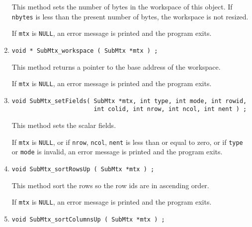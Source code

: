 \begin{enumerate}
\begin{verbatim}
\end{verbatim}
\par
This method sets the number of bytes in the workspace of this object.
If {\tt nbytes} is less than the present number of bytes, 
the workspace is not resized.
\par {}
If {\tt mtx} is {\tt NULL},
an error message is printed and the program exits.
\item
\begin{verbatim}
void * SubMtx_workspace ( SubMtx *mtx ) ;
\end{verbatim}
This method returns a pointer to the base address of the workspace.
\par {}
If {\tt mtx} is {\tt NULL},
an error message is printed and the program exits.
\item
\begin{verbatim}
void SubMtx_setFields( SubMtx *mtx, int type, int mode, int rowid, 
                       int colid, int nrow, int ncol, int nent ) ;
\end{verbatim}
This method sets the scalar fields.
\par {}
If {\tt mtx} is {\tt NULL},
or if {\tt nrow}, {\tt ncol}, {\tt nent}
is less than or equal to zero,
or if {\tt type} or {\tt mode} is invalid,
an error message is printed and the program exits.
\item
\begin{verbatim}
void SubMtx_sortRowsUp ( SubMtx *mtx ) ;
\end{verbatim}
This method sort the rows so the row ids are in ascending order.
\par {}
If {\tt mtx} is {\tt NULL},
an error message is printed and the program exits.
\item
\begin{verbatim}
void SubMtx_sortColumnsUp ( SubMtx *mtx ) ;
\end{verbatim}

\end{enumerate}
